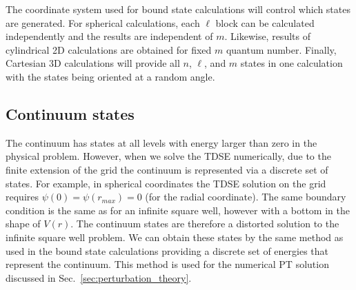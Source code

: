 The coordinate system used for bound state calculations will control which states are generated. For spherical calculations, each $\ell$ block can be calculated independently and the results are independent of $m$. Likewise, results of cylindrical 2D calculations are obtained for fixed $m$ quantum number. Finally, Cartesian 3D calculations will provide all $n$, $\ell$, and $m$ states in one calculation with the states being oriented at a random angle.

\subsection{Continuum states} %
\label{sub:continuum_states}
The continuum has states at all levels with energy larger than zero in the physical problem. However, when we solve the TDSE numerically, due to the finite extension of the grid the continuum is represented via a discrete set of states. For example, in spherical coordinates the TDSE solution on the grid requires $\psi(0) = \psi(r_{max}) = 0$ (for the radial coordinate). The same boundary condition is the same as for an infinite square well, however with a bottom in the shape of $V(r)$. The continuum states are therefore a distorted solution to the infinite square well problem. We can obtain these states by the same method as used in the bound state calculations providing a discrete set of energies that represent the continuum. This method is used for the numerical PT solution discussed in Sec.~\ref{sec:perturbation_theory}.

